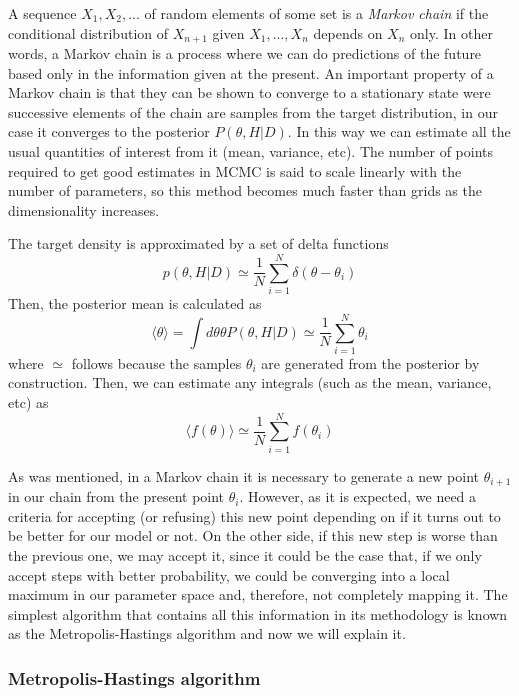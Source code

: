 \documentclass[onecolumn,           %
               showpacs,            %
               preprintnumbers,     %
               aps,                 %
               prl,          	    %
               letterpaper,             %
               superscriptaddress,      %
               nofootinbib,         %
               tightenlines,        %
               floats,floatfix      %
               ,usenatbib,
               ]{revtex4-1}
\begin{document}
A sequence $X_1,X_2,...$ of random elements of some set is a \textit{Markov chain} if the conditional distribution of $X_{n+1}$ given $X_1,...,X_n$ depends on $X_n$ only. In other words, a Markov chain is a process where we can do predictions of the future based only in the information given at the present. An important property of a Markov chain is that they can be shown to converge to a stationary state were successive elements of the chain are samples from the target distribution, in our case it converges to the posterior $P(\theta,H|D)$. In this way we can estimate all the usual quantities of interest from it (mean, variance, etc). The number of points required to get good estimates in MCMC is said to scale linearly with the number of parameters, so this method becomes much faster than grids as the dimensionality increases.

The target density is approximated by a set of delta functions
\begin{equation}
p(\theta,H|D)\simeq \frac{1}{N}\sum_{i=1}^N \delta(\theta-\theta_i)
\end{equation}
Then, the posterior mean is calculated as
\begin{equation}
\langle\theta\rangle=\int d\theta \theta P(\theta,H|D)\simeq \frac{1}{N}\sum_{i=1}^N\theta_i
\end{equation}
where $\simeq$ follows because the samples $\theta_i$ are generated from the posterior by construction. Then, we can estimate any integrals (such as the mean, variance, etc) as
\begin{equation}
\langle f(\theta)\rangle \simeq\frac{1}{N}\sum_{i=1}^N f(\theta_i)
\end{equation}

As was mentioned, in a Markov chain it is necessary to generate a new point $\theta_{i+1}$ in our chain from the present point $\theta_i$. However, as it is expected, we need a criteria for accepting (or refusing) this new point depending on if it turns out to be better for our model or not. On the other side, if this new step is worse than the previous one, we may accept it, since it could be the case that, if we only accept steps with better probability, we could be converging into a local maximum in our parameter space and, therefore, not completely mapping it. The simplest algorithm that contains all this information in its methodology is known as the Metropolis-Hastings algorithm and now we will explain it.
\subsubsection{Metropolis-Hastings algorithm}
\end{document}
